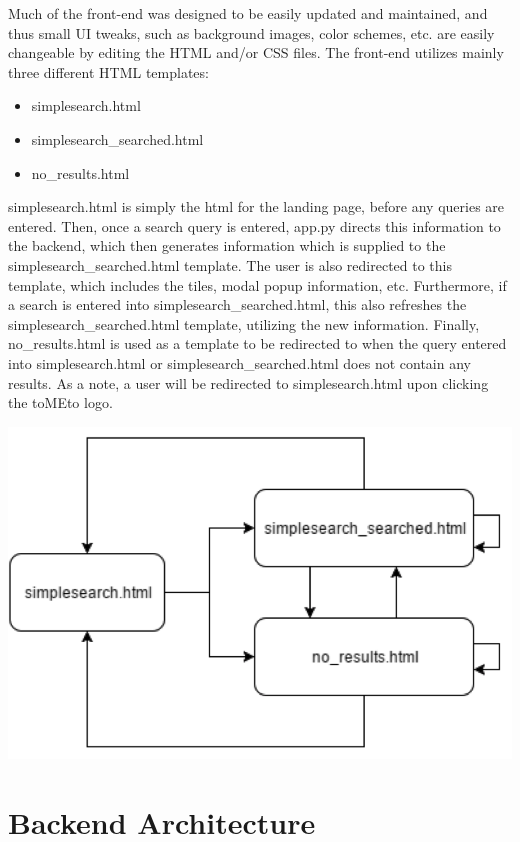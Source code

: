 \documentclass{acm_proc_article-sp}
\begin{document}
Much of the front-end was designed to be easily updated and maintained, and thus small UI tweaks, such as background images, color schemes, etc. are easily changeable by editing the HTML and/or CSS files. The front-end utilizes mainly three different HTML templates:
\begin{itemize}
\item simplesearch.html
\item simplesearch\_searched.html 
\item no\_results.html
\end{itemize}
simplesearch.html is simply the html for the landing page, before any queries are entered. Then, once a search query is entered, app.py directs this information to the backend, which then generates information which is supplied to the simplesearch\_searched.html template. The user is also redirected to this template, which includes the tiles, modal popup information, etc. Furthermore, if a search is entered into simplesearch\_searched.html, this also refreshes the simplesearch\_searched.html template, utilizing the new information. Finally, no\_results.html is used as a template to be redirected to when the query entered into simplesearch.html or simplesearch\_searched.html does not contain any results. As a note, a user will be redirected to simplesearch.html upon clicking the toMEto logo.

\includegraphics[scale=0.5]{p4.png}


\section{Backend Architecture}
\end{document}
